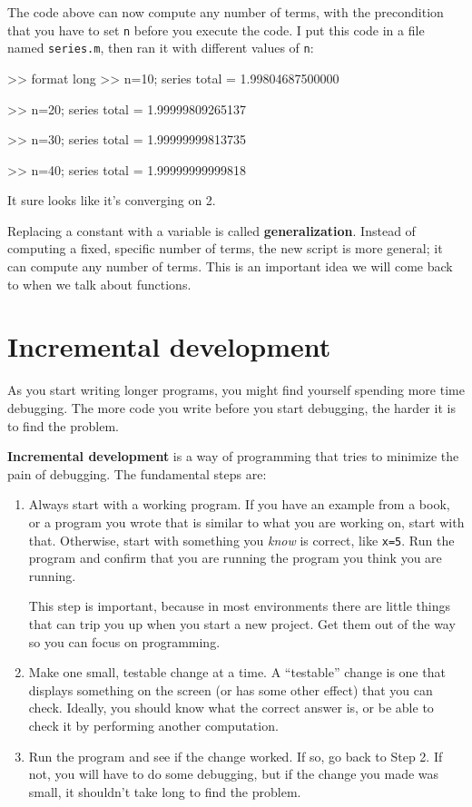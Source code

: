 \documentclass[main.tex]{subfiles}
\begin{document}
The code above can now compute any number of terms, with the
precondition that you have to set {\tt n} before you execute
the code.  
I put this code in a file named {\tt series.m}, then
ran it with different values of {\tt n}:

\begin{code}
>> format long
>> n=10; series
total = 1.99804687500000

>> n=20; series
total = 1.99999809265137

>> n=30; series
total = 1.99999999813735

>> n=40; series
total = 1.99999999999818
\end{code}

It sure looks like it's converging on 2.

Replacing a constant with a variable is called {\bf generalization}.
Instead of computing a fixed, specific number of terms, the new script
is more general; it can compute any number of terms.
This is an important idea we will come back to when we talk about functions.

\section{Incremental development}


As you start writing longer programs, you might find yourself spending more time debugging.
The more code you write before you start debugging, the harder it is to find
the problem.

{\bf Incremental development} is a way of programming that tries
to minimize the pain of debugging.  The fundamental steps are:

\begin{enumerate}

\item Always start with a working program.  If you have an
example from a book, or a program you wrote that is similar to
what you are working on, start with that.  Otherwise, start with
something you {\em know} is correct, like {\tt x=5}.  Run the program
and confirm that you are running the program you think you are
running.

This step is important, because in most environments there
are little things that can trip you up when you start a new
project.  Get them out of the way so you can focus on programming.

\item Make one small, testable change at a time.  A ``testable''
change is one that displays something on the screen (or has some
other effect) that you can check.  Ideally, you should know what
the correct answer is, or be able to check it by performing another
computation.

\item Run the program and see if the change worked.  If so, go back
to Step 2.  If not, you will have to do some debugging, but if the
change you made was small, it shouldn't take long to find the problem.

\end{enumerate}
\end{document}
